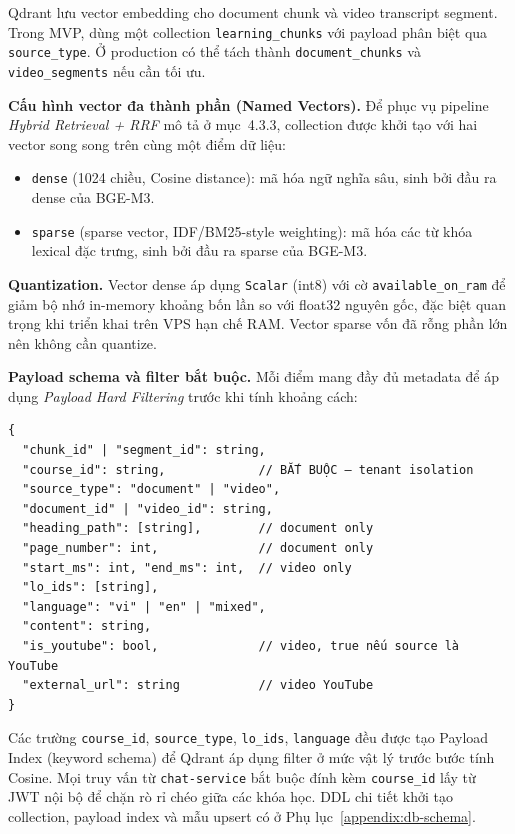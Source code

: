 Qdrant lưu vector embedding cho document chunk và video transcript segment.
Trong MVP, dùng một collection \texttt{learning\_chunks} với payload phân
biệt qua \texttt{source\_type}. Ở production có thể tách thành
\texttt{document\_chunks} và \texttt{video\_segments} nếu cần tối ưu.

\textbf{Cấu hình vector đa thành phần (Named Vectors).} Để phục vụ pipeline
\emph{Hybrid Retrieval + RRF} mô tả ở mục~4.3.3, collection được khởi tạo
với hai vector song song trên cùng một điểm dữ liệu:

\begin{itemize}
    \item \texttt{dense} (1024 chiều, Cosine distance): mã hóa ngữ nghĩa
          sâu, sinh bởi đầu ra dense của BGE-M3.
    \item \texttt{sparse} (sparse vector, IDF/BM25-style weighting): mã hóa
          các từ khóa lexical đặc trưng, sinh bởi đầu ra sparse của BGE-M3.
\end{itemize}

\textbf{Quantization.} Vector dense áp dụng \texttt{Scalar} (int8) với cờ
\texttt{available\_on\_ram} để giảm bộ nhớ in-memory khoảng bốn lần so với
float32 nguyên gốc, đặc biệt quan trọng khi triển khai trên VPS hạn chế
RAM. Vector sparse vốn đã rỗng phần lớn nên không cần quantize.

\textbf{Payload schema và filter bắt buộc.} Mỗi điểm mang đầy đủ metadata
để áp dụng \emph{Payload Hard Filtering} trước khi tính khoảng cách:

\begin{verbatim}
{
  "chunk_id" | "segment_id": string,
  "course_id": string,             // BẮT BUỘC — tenant isolation
  "source_type": "document" | "video",
  "document_id" | "video_id": string,
  "heading_path": [string],        // document only
  "page_number": int,              // document only
  "start_ms": int, "end_ms": int,  // video only
  "lo_ids": [string],
  "language": "vi" | "en" | "mixed",
  "content": string,
  "is_youtube": bool,              // video, true nếu source là YouTube
  "external_url": string           // video YouTube
}
\end{verbatim}

Các trường \texttt{course\_id}, \texttt{source\_type}, \texttt{lo\_ids},
\texttt{language} đều được tạo Payload Index (keyword schema) để Qdrant
áp dụng filter ở mức vật lý trước bước tính Cosine. Mọi truy vấn từ
\texttt{chat-service} bắt buộc đính kèm \texttt{course\_id} lấy từ JWT
nội bộ để chặn rò rỉ chéo giữa các khóa học. DDL chi tiết khởi tạo
collection, payload index và mẫu upsert có ở Phụ lục~\ref{appendix:db-schema}.

